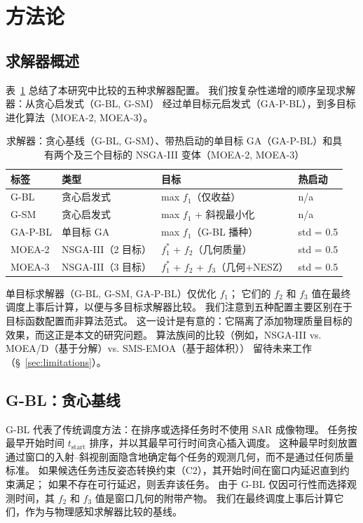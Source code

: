 \documentclass[preprint,12pt,authoryear]{elsarticle}
\begin{document}
\section{方法论}
\subsection{求解器概述}
表~\ref{tab:solvers} 总结了本研究中比较的五种求解器配置。
我们按复杂性递增的顺序呈现求解器：从贪心启发式（G-BL, G-SM）
经过单目标元启发式（GA-P-BL），到多目标进化算法（MOEA-2, MOEA-3）。
\begin{table}[H]
\centering
\caption{求解器：贪心基线（G-BL, G-SM）、带热启动的单目标 GA（GA-P-BL）和具有两个及三个目标的 NSGA-III 变体（MOEA-2, MOEA-3）}
\label{tab:solvers}
\small
\setlength{\tabcolsep}{4pt}
\begin{tabular}{llll}
\toprule
\textbf{标签} & \textbf{类型} & \textbf{目标} & \textbf{热启动} \\
\midrule
G-BL   & 贪心启发式       & max $f_1$（仅收益）                  & n/a \\
G-SM   & 贪心启发式       & max $f_1$ + 斜视最小化          & n/a \\
GA-P-BL& 单目标 GA    & max $f_1$（G-BL 播种）                  & std = 0.5 \\
MOEA-2 & NSGA-III（2 目标） & $f_1^*$ + $f_2$（几何质量）      & std = 0.5 \\
MOEA-3 & NSGA-III（3 目标） & $f_1^*$ + $f_2$ + $f_3$（几何+NESZ）     & std = 0.5 \\
\bottomrule
\end{tabular}
\end{table}
单目标求解器（G-BL, G-SM, GA-P-BL）仅优化 $f_1$；
它们的 $f_2$ 和 $f_3$ 值在最终调度上事后计算，以便与多目标求解器比较。
我们注意到五种配置主要区别在于目标函数配置而非算法范式。
这一设计是有意的：它隔离了添加物理质量目标的效果，而这正是本文的研究问题。
算法族间的比较（例如，NSGA-III vs. MOEA/D（基于分解）vs. SMS-EMOA（基于超体积））
留待未来工作（\S~\ref{sec:limitations}）。
\subsection{G-BL：贪心基线}
\label{sec:gbl}
G-BL 代表了传统调度方法：在排序或选择任务时不使用 SAR 成像物理。
任务按最早开始时间 $t_{\text{start}}$ 排序，并以其最早可行时间贪心插入调度。
这种最早时刻放置通过窗口的入射--斜视剖面隐含地确定每个任务的观测几何，而不是通过任何质量标准。
如果候选任务违反姿态转换约束（C2），其开始时间在窗口内延迟直到约束满足；
如果不存在可行延迟，则丢弃该任务。
由于 G-BL 仅因可行性而选择观测时间，其 $f_2$ 和 $f_3$ 值是窗口几何的附带产物。
我们在最终调度上事后计算它们，作为与物理感知求解器比较的基线。
\end{document}
